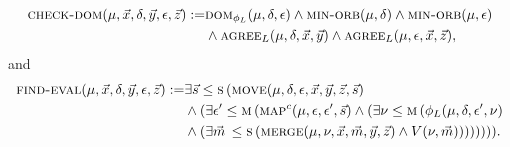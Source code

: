 \documentclass[../paper.tex]{subfiles}
\begin{document}
\begin{align*}
	\textsc{check-dom}(\mu, \vec{x}, \delta, \vec{y}, \epsilon, \vec{z})  := & \textsc{dom}_{\phi_L} (\mu, \delta, \epsilon) \land \textsc{min-orb}(\mu, \delta)\land \textsc{min-orb} (\mu, \epsilon) \\ & \land \textsc{agree}_L (\mu, \delta , \vec{x}, \vec{y}) \land \textsc{agree}_L (\mu, \epsilon , \vec{x}, \vec{z}), 
\end{align*}
and
\begin{align*}
	\textsc{find-eval} (\mu, \vec{x}, \delta, \vec{y}, \epsilon, \vec{z}) := & \exists \vec{s} \leq \textsc{s} \, (\textsc{move}(\mu, \delta, \epsilon, \vec{x}, \vec{y}, \vec{z}, \vec{s}) \\ & \land (\exists \epsilon' \leq \textsc{m} \, (\textsc{map}^c (\mu, \epsilon, \epsilon', \vec{s}) \land (\exists \nu \leq \textsc{m} \, (\phi_L (\mu, \delta, \epsilon', \nu) \\ & \land (\exists \vec{m} \, \leq \textsc{s} \, (\textsc{merge} (\mu, \nu, \vec{x}, \vec{m}, \vec{y}, \vec{z}) \land V(\nu, \vec{m})))))))).
\end{align*}
				
				
				
\end{document}
